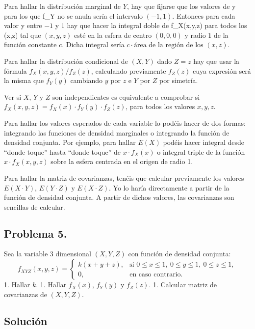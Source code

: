 \documentclass[
]{article}
\begin{document}
Para hallar la distribución marginal de \(Y\), hay que fijarse que los
valores de y para los que f\_Y no se anula sería el intervalo
\((-1,1)\). Entonces para cada valor y entre \(-1\) y \(1\) hay que
hacer la integral doble de f\_X(x,y,z) para todos los (x,z) tal que
\((x,y,z)\) esté en la esfera de centro \((0,0,0)\) y radio \(1\) de la
función constante \(c\). Dicha integral sería
\(c\cdot \mbox{área de la región de los } (x,z)\).

Para hallar la distribución condicional de \((X,Y)\) dado \(Z=z\) hay
que usar la fórmula \(f_X(x,y,z)/f_Z(z)\), calculando previamente
\(f_Z(z)\) cuya expresión será la misma que \(f_Y(y)\) cambiando \(y\)
por \(z\) e \(Y\) por \(Z\) por simetría.

Ver si \(X\), \(Y\) y \(Z\) son independientes es equivalente a
comprobar si \(f_X(x,y,z)=f_X(x)\cdot f_Y(y)\cdot f_Z(z)\), para todos
los valores \(x,y,z\).

Para hallar los valores esperados de cada variable lo podéis hacer de
dos formas: integrando las funciones de densidad marginales o integrando
la función de densidad conjunta. Por ejemplo, para hallar \(E(X)\)
podéis hacer integral desde ``donde toque'' hasta ``donde toque'' de
\(x\cdot f_X(x)\) o integral triple de la función \(x\cdot f_X(x,y,z)\)
sobre la esfera centrada en el origen de radio 1.

Para hallar la matriz de covarianzas, tenéis que calcular previamente
los valores \(E(X\cdot Y)\), \(E(Y\cdot Z)\) y \(E(X\cdot Z)\). Yo lo
haría directamente a partir de la función de densidad conjunta. A partir
de dichos valores, las covarianzas son sencillas de calcular.

\hypertarget{problema-5.}{%
\subsection{Problema 5.}\label{problema-5.}}

Sea la variable \(3\) dimensional \((X, Y, Z)\) con función de densidad
conjunta: \[
f_{XYZ}(x,y,z)=\begin{cases}
k(x+y+z), & \mbox{si }0\leq x\leq 1,\ 0\leq y\leq 1,\ 0\leq z\leq 1,\\
0, & \mbox{en caso contrario.}
\end{cases}
\] 1. Hallar \(k\). 1. Hallar \(f_X(x)\), \(f_Y(y)\) y \(f_Z(z)\). 1.
Calcular matriz de covarianzas de \((X,Y,Z)\).

\hypertarget{soluciuxf3n-4}{%
\subsection{Solución}\label{soluciuxf3n-4}}
\end{document}
